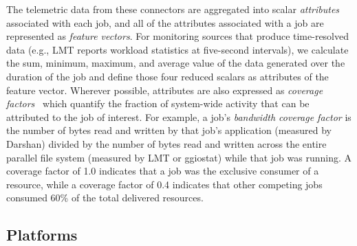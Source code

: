 The telemetric data from these connectors are aggregated into scalar \emph{attributes} associated with each job, and all of the attributes associated with a job are represented as \emph{feature vectors}.
For monitoring sources that produce time-resolved data (e.g., LMT reports workload statistics at five-second intervals), we calculate the sum, minimum, maximum, and average value of the data generated over the duration of the job and define those four reduced scalars as attributes of the feature vector.
Wherever possible, attributes are also expressed as \emph{coverage factors}~\cite{Lockwood2017} which quantify the fraction of system-wide activity that can be attributed to the job of interest.
For example, a job's \emph{bandwidth coverage factor} is the number of bytes read and written by that job's application (measured by Darshan) divided by the number of bytes read and written across the entire parallel file system (measured by LMT or ggiostat) while that job was running.
A coverage factor of 1.0 indicates that a job was the exclusive consumer of
a resource, while a coverage factor of 0.4 indicates that other competing
jobs consumed 60\% of the total delivered resources.


\subsection{Platforms}\label{sec:methods/platforms}


